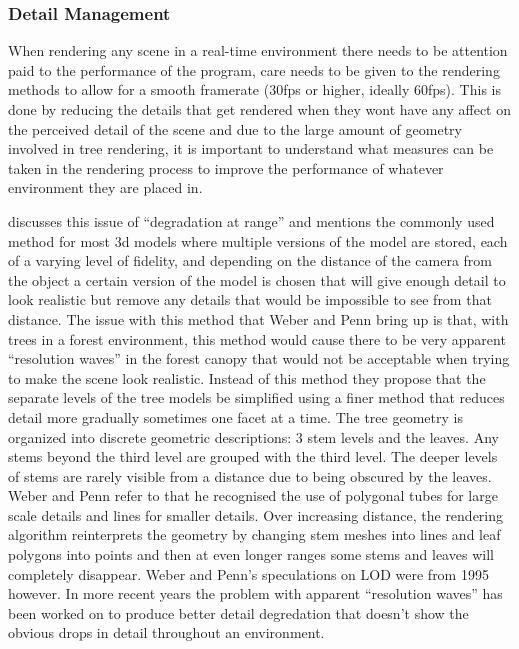 \documentclass[review]{cmpreport}
\begin{document}
\subsubsection{Detail Management}
When rendering any scene in a real-time environment there needs to be attention paid to the 
performance of the program, care needs to be given to the rendering methods to allow for a 
smooth framerate (30fps or higher, ideally 60fps). This is done by reducing the details that 
get rendered when they wont have any affect on the perceived detail of the scene and due to 
the large amount of geometry involved in tree rendering, it is important to understand what  
measures can be taken in the rendering process to improve the performance of whatever 
environment they are placed in. \par
\cite{weber1995rendering} discusses this issue of ``degradation at range'' and mentions the 
commonly used method for most 3d models where multiple versions of the model are stored, 
each of a varying level of fidelity, and depending on the distance of the camera from the 
object a certain version of the model is chosen that will give enough detail to look realistic 
but remove any details that would be impossible to see from that distance. The issue with this 
method that Weber and Penn bring up is that, with trees in a forest environment, this method 
would cause there to be very apparent ``resolution waves'' in the forest canopy that would not 
be acceptable when trying to make the scene look realistic. Instead of this method they propose 
that the separate levels of the tree models be simplified using a finer method that reduces 
detail more gradually sometimes one facet at a time. The tree geometry is organized into 
discrete geometric descriptions: 3 stem levels and the leaves. Any stems beyond the third 
level are grouped with the third level. The deeper levels of stems are rarely visible from a 
distance due to being obscured by the leaves. Weber and Penn refer to \cite{oppenheimer1986real} 
that he recognised the use of polygonal tubes for large scale details and lines for smaller 
details. Over increasing distance, the rendering algorithm reinterprets the geometry by 
changing stem meshes into lines and leaf polygons into points and then at even longer ranges 
some stems and leaves will completely disappear. 
Weber and Penn's speculations on LOD were from 1995 however. In more recent years the problem 
with apparent ``resolution waves'' has been worked on to produce better detail degredation that 
doesn't show the obvious drops in detail throughout an environment. 

\clearpage

\end{document}
